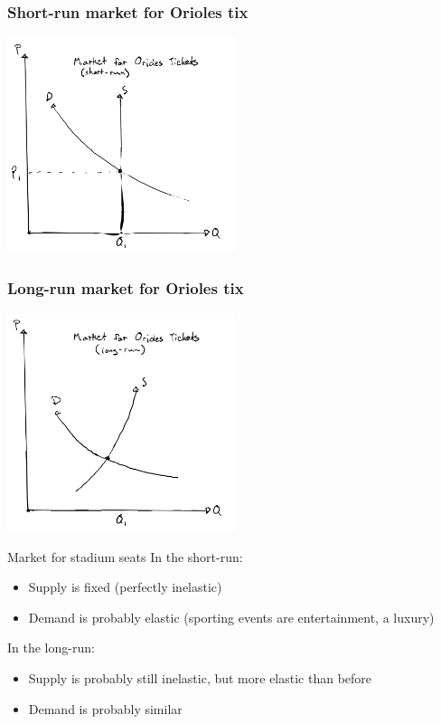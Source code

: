 \documentclass[aspectratio=169]{beamer}
\begin{document}
\begin{frame}
    \frametitle{Short-run market for Orioles tix}
    \centering
    \includegraphics[width = 0.5\textwidth,keepaspectratio]{Orioles_short.png}
\end{frame}

\begin{frame}
    \frametitle{Long-run market for Orioles tix}
    \centering
    \includegraphics[width = 0.5\textwidth,keepaspectratio]{Orioles_long.png}
\end{frame}

\begin{frame}{Market for stadium seats}
    In the short-run:
    \begin{itemize}
        \item Supply is fixed (perfectly inelastic)
        \item Demand is probably elastic (sporting events are entertainment, a luxury)
    \end{itemize}

    In the long-run:
    \begin{itemize}
        \item Supply is probably still inelastic, but more elastic than before
        \item Demand is probably similar
    \end{itemize}
\end{frame}
\end{document}
